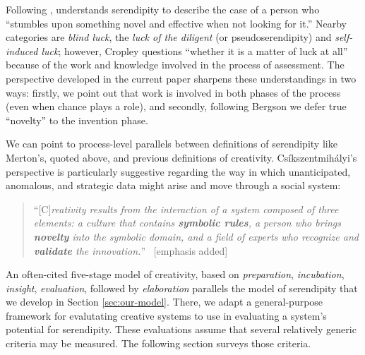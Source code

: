 Following ,  understands serendipity to
describe the case of a person who ``stumbles upon something novel and
effective when not looking for it.''  Nearby categories are
\emph{blind luck}, the \emph{luck of the diligent} (or
pseudoserendipity) and \emph{self-induced luck}; however, Cropley
questions ``whether it is a matter of luck at all'' because of the
work and knowledge involved in the process of assessment.
%
The perspective developed in the current paper sharpens these
understandings in two ways: firstly, we point out that work is
involved in both phases of the process (even when chance plays a
role), and secondly, following Bergson we defer true ``novelty'' to
the invention phase.


We can point to process-level parallels between definitions of
serendipity like Merton's, quoted above, and previous definitions of
creativity.  Cs\'ikszentmih\'alyi's perspective is particularly
suggestive regarding the way in which unanticipated, anomalous, and
strategic data might arise and move through a social system:
\begin{quote}
``{[}C{]}\emph{reativity results from the interaction of a system
    composed of three elements: a culture that contains 
   \emph{\textbf{symbolic rules}}, a person who brings 
    \emph{\textbf{novelty}} into the symbolic domain, and a
    field of experts who recognize and 
    \emph{\textbf{validate}} the innovation.}''
  \cite[p.~6]{csikszentmihalyi1997flow}~{[}emphasis added{]}
\end{quote}

An often-cited five-stage model of creativity, based on
\emph{preparation}, \emph{incubation}, \emph{insight},
\emph{evaluation}, followed by \emph{elaboration}  parallels the
model of serendipity that we develop in Section \ref{sec:our-model}.
There, we adapt a general-purpose framework for evalutating creative
systems \cite{jordanous:12} to use in evaluating a system's potential
for serendipity.  These evaluations assume that several relatively
generic criteria may be measured.  The following section surveys those
criteria.
 
%

